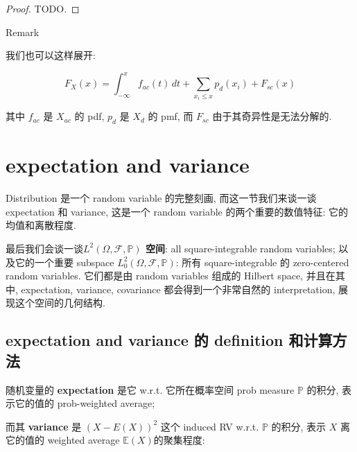 \documentclass{qlnotes-export}
\begin{document}
\begin{proof}

TODO.

\end{proof}

\begin{qlremark}{Remark}

我们也可以这样展开:

\[F_{X}(x) = \int_{- \infty}^{x}f_{ac}(t)\, dt + \sum\limits_{x_{i} \leq x}p_{d}(x_{i}) + F_{sc}(x)\]

其中 \(f_{ac}\) 是 \(X_{ac}\) 的 pdf, \(p_{d}\) 是 \(X_{d}\) 的 pmf, 而 \(F_{sc}\) 由于其奇异性是无法分解的.

\end{qlremark}

\section{expectation and variance}\label{expectation-and-variance}

Distribution 是一个 random variable 的完整刻画, 而这一节我们来谈一谈 expectation 和 variance, 这是一个 random variable 的两个重要的数值特征: 它的均值和离散程度.

最后我们会谈一谈\textbf{\(L^{2}(\Omega,\mathcal{F},{\mathbb{P}})\) 空间}: all square-integrable random variables; 以及它的一个重要 subspace \(L_{0}^{2}(\Omega,\mathcal{F},{\mathbb{P}})\): 所有 square-integrable 的 zero-centered random variables. 它们都是由 random variables 组成的 Hilbert space, 并且在其中, expectation, variance, covariance 都会得到一个非常自然的 interpretation, 展现这个空间的几何结构.

\subsection{expectation and variance 的 definition 和计算方法}\label{expectation-and-variance-ux7684-definition-ux548cux8ba1ux7b97ux65b9ux6cd5}

随机变量的 \textbf{expectation} 是它 w.r.t. 它所在概率空间 prob measure \(\mathbb{P}\) 的积分, 表示它的值的 prob-weighted average;

而其 \textbf{variance} 是 \((X - E(X))^{2}\) 这个 induced RV w.r.t. \(\mathbb{P}\) 的积分, 表示 \(X\) 离它的值的 weighted average \({\mathbb{E}}(X)\)的聚集程度:
\end{document}
